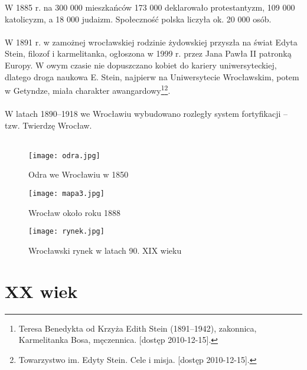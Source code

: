 \documentclass[12pt]{article}
\begin{document}
W 1885 r. na 300 000 mieszkańców 173 000 deklarowało protestantyzm, 109 000 katolicyzm, a 18 000 judaizm. Społeczność polska liczyła ok. 20 000 osób.\\\\
W 1891 r. w zamożnej wrocławskiej rodzinie żydowskiej przyszła na świat Edyta Stein, filozof i karmelitanka, ogłoszona w 1999 r. przez Jana Pawła II patronką Europy. W owym czasie nie dopuszczano kobiet do kariery uniwersyteckiej, dlatego droga naukowa E. Stein, najpierw na Uniwersytecie Wrocławskim, potem w Getyndze, miała charakter awangardowy\footnote{Teresa Benedykta od Krzyża Edith Stein (1891–1942), zakonnica, Karmelitanka Bosa, męczennica. [dostęp 2010-12-15].}\footnote{Towarzystwo im. Edyty Stein. Cele i misja. [dostęp 2010-12-15].}.\\\\
W latach 1890–1918 we Wrocławiu wybudowano rozległy system fortyfikacji – tzw. Twierdzę Wrocław.\\\\ 
\begin{figure}[h]
    \centering
    \texttt{[image: odra.jpg]}
    \caption{Odra we Wrocławiu w 1850}
    \label{fig:odra}
\end{figure}
\begin{figure}[h]
    \centering
    \texttt{[image: mapa3.jpg]}
    \caption{Wrocław około roku 1888}
    \label{fig:mapa3}
\end{figure}
\begin{figure}[h]
    \centering
    \texttt{[image: rynek.jpg]}
    \caption{Wrocławski rynek w latach 90. XIX wieku}
    \label{fig:rynek}
\end{figure}

\section{XX wiek}
\end{document}
